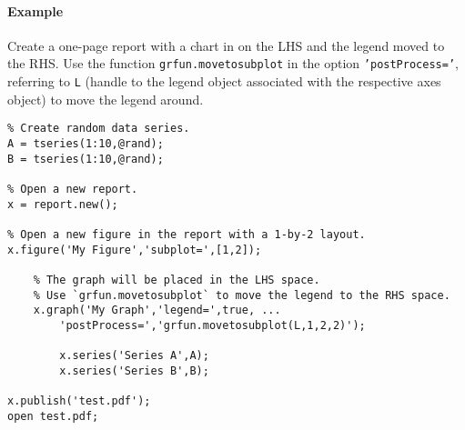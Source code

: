 \paragraph{Example}\label{example}

Create a one-page report with a chart in on the LHS and the legend moved
to the RHS. Use the function \texttt{grfun.movetosubplot} in the option
\texttt{'postProcess='}, referring to \texttt{L} (handle to the legend
object associated with the respective axes object) to move the legend
around.

\begin{verbatim}
% Create random data series.
A = tseries(1:10,@rand);
B = tseries(1:10,@rand);

% Open a new report.
x = report.new();

% Open a new figure in the report with a 1-by-2 layout.
x.figure('My Figure','subplot=',[1,2]);

    % The graph will be placed in the LHS space.
    % Use `grfun.movetosubplot` to move the legend to the RHS space.
    x.graph('My Graph','legend=',true, ...
        'postProcess=','grfun.movetosubplot(L,1,2,2)');

        x.series('Series A',A);
        x.series('Series B',B);

x.publish('test.pdf');
open test.pdf;
\end{verbatim}


